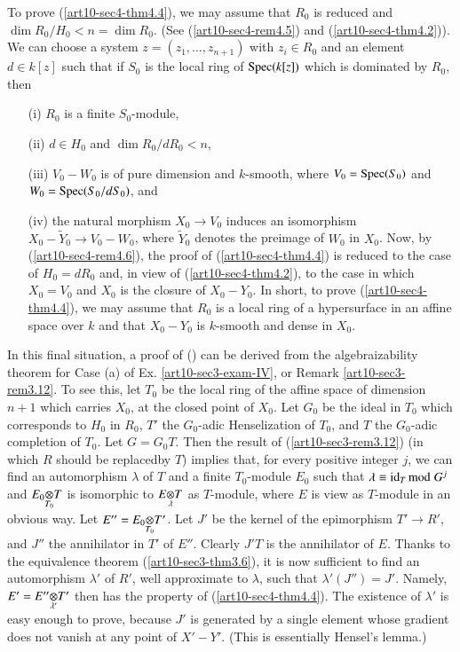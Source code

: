 \begin{remark}\label{art10-sec4-rem4.7}
To prove (\ref{art10-sec4-thm4.4}), we may assume that $R_{0}$ is reduced and $\dim R_{0}/H_{0}<n=\dim R_{0}$. (See (\ref{art10-sec4-rem4.5}) and (\ref{art10-sec4-thm4.2})). We can choose a system $z=(z_{1},\ldots,z_{n+1})$ with $z_{i}\in R_{0}$ and an element $d\in k[z]$ such that if $S_{0}$ is the local ring of $\operatorname{\mathrm{Spec}} (k[z])$ which is dominated by $R_{0}$, then
\begin{itemize}
\item[(i)] $R_{0}$ is a finite $S_{0}$-module,

\item[(ii)] $d\in H_{0}$ and $\dim R_{0}/dR_{0}<n$,

\item[(iii)] $V_{0}-W_{0}$ is of pure dimension and $k$-smooth, where $V_{0}=\operatorname{\mathrm{Spec}} (S_{0})$ and $W_{0}=\operatorname{\mathrm{Spec}} (S_{0}/dS_{0})$, and 

\item[(iv)] the natural morphism $X_{0}\to V_{0}$ induces an isomorphism $X_{0}-\widetilde{Y}_{0}\to V_{0}-W_{0}$, where $\widetilde{Y}_{0}$ denotes the preimage of $W_{0}$ in $X_{0}$. Now, by (\ref{art10-sec4-rem4.6}), the proof of (\ref{art10-sec4-thm4.4}) is reduced to the case of $H_{0}=dR_{0}$ and, in view of (\ref{art10-sec4-thm4.2}), to the case in which $X_{0}=V_{0}$ and $X_{0}$ is the closure of $X_{0}-Y_{0}$. In short, to prove (\ref{art10-sec4-thm4.4}), we may assume that $R_{0}$ is a local ring of a hypersurface in an affine space over $k$ and that $X_{0}-Y_{0}$ is $k$-smooth and dense in $X_{0}$.
\end{itemize}

In this final situation, a proof of (\label{art10-sec4-thm4.4}) can be derived from the algebraizability theorem for Case (a) of Ex. \ref{art10-sec3-exam-IV}, or Remark \ref{art10-sec3-rem3.12}. To see this, let $T_{0}$ be the local ring of the affine space of dimension $n+1$ which carries $X_{0}$, at the closed point of $X_{0}$. Let $G_{0}$ be the ideal in $T_{0}$ which corresponds to $H_{0}$ in $R_{0}$, $T'$ the $G_{0}$-adic Henselization of $T_{0}$, and $T$ the $G_{0}$-adic completion of $T_{0}$. Let $G=G_{0}T$. Then the result of (\ref{art10-sec3-rem3.12}) (in which $R$ should be replaced\pageoriginale by $T$) implies that, for every positive integer $j$, we can find an automorphism $\lambda$ of $T$ and a finite $T_{0}$-module $E_{0}$ such that $\lambda\equiv\operatorname{\mathrm{id}}_{T}{\rm{mod}}\kern.3em G^{j}$ and $\foprod{E_{0}}{T}{T_{0}}$ is isomorphic to $\foprod{E}{T}{\lambda}$ as $T$-module, where $E$ is view as $T$-module in an obvious way. Let $E''=\foprod{E_{0}}{T'}{T_{0}}$. Let $J'$ be the kernel of the epimorphism $T'\to R'$, and $J''$ the annihilator in $T'$ of $E''$. Clearly $J'T$ is the annihilator of $E$. Thanks to the equivalence theorem (\ref{art10-sec3-thm3.6}), it is now sufficient to find an automorphism $\lambda'$ of $R'$, well approximate to $\lambda$, such that $\lambda'(J'')=J'$. Namely, $E'=\foprod{E''}{T'}{\lambda'}$ then has the property of (\ref{art10-sec4-thm4.4}). The existence of $\lambda'$ is easy enough to prove, because $J'$ is generated by a single element whose gradient does not vanish at any point of $X'-Y'$. (This is essentially Hensel's lemma.)
\end{remark}

